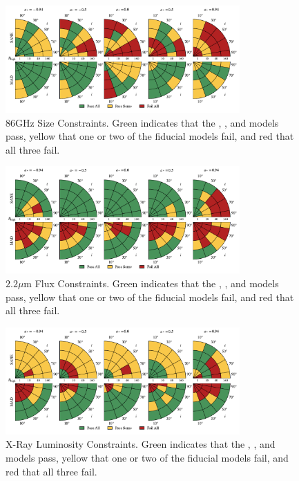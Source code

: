 \begin{figure}
  \centering
  \includegraphics[width=0.8\textwidth]{./figures/86GHz_size_Constraints.pdf}
  \caption{86GHz Size Constraints.  Green indicates that the \kharma, \bhac, and \hamr models pass, yellow that one or two of the fiducial models fail, and red that all three fail.}
  \label{fig:86GHz_size_pizza}
\end{figure}

\begin{figure}
  \centering
  \includegraphics[width=0.8\textwidth]{./figures/2um_flux_Constraints.pdf}
  \caption{$2.2\mu$m Flux Constraints.  Green indicates that the \kharma, \bhac, and \hamr models pass, yellow that one or two of the fiducial models fail, and red that all three fail.}
  \label{fig:2um_flux_pizza}
\end{figure}

\begin{figure}
  \centering
  \includegraphics[width=0.8\textwidth]{./figures/Xray_flux_Constraints.pdf}
  \caption{X-Ray Luminosity Constraints.  Green indicates that the \kharma, \bhac, and \hamr models pass, yellow that one or two of the fiducial models fail, and red that all three fail.}
  \label{fig:xray_pizza}
\end{figure}

